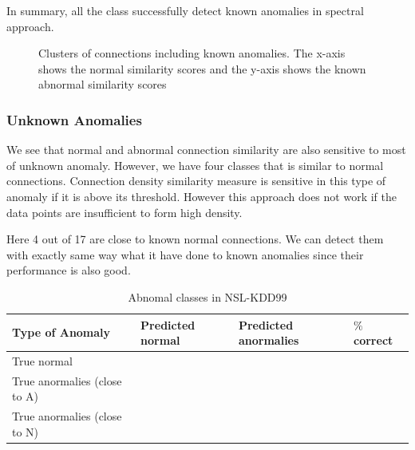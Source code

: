 In summary, all the class successfully detect known anomalies in spectral approach. 

\begin{figure}[htb2]
\begin{center}
\end{center}
\caption{Clusters of connections including known anomalies. The x-axis shows the normal similarity scores and the y-axis shows the known abnormal similarity scores}
\label{fig:refSingleRobot1}
\end{figure}

\subsubsection{Unknown Anomalies}
We see that normal and abnormal connection similarity are also sensitive to most of unknown anomaly. 
However, we have four classes that is similar to normal connections. 
Connection density similarity measure is sensitive in this type of anomaly if it is above its threshold. 
However this approach does not work if the data points are insufficient to form high density.

Here 4 out of 17 are close to known normal connections. 
We can detect them with exactly same way what it have done to known anomalies since their performance is also good. 
\begin{table}[h]
\begin{center}
\begin{tabular}{| l | l | l | p{5cm} |}
\hline
Type of Anomaly & Predicted normal & Predicted anormalies & $\%$ correct\\
\hline
True normal &  &  & \\
\hline
True anormalies (close to A)&  &  & \\
\hline
True anormalies (close to N) &  &  & \\
\hline
\end{tabular}
\end{center}
\caption{Abnomal classes in NSL-KDD99}
\label{fig:refSingleRobot1}
\end{table}

